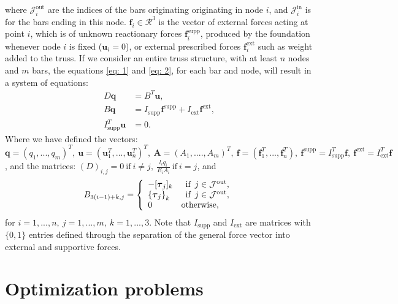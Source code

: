 \documentclass[10pt,a4paper]{article}
\begin{document}
where $\mathcal{J}_i^{\text{out}}$ are the indices of the bars originating originating in node $i$, and $\mathcal{J}_i^{\text{in}}$ is for the bars ending in this node. $\boldsymbol{f}_i\in\mathcal{R}^3$ is the vector of external forces acting at point $i$, which is of unknown reactionary forces $\boldsymbol{f}_i^{\text{supp}}$, produced by the foundation whenever node $i$ is fixed ($\boldsymbol{u}_i = 0$), or external prescribed forces $\boldsymbol{f}_i^{\text{ext}}$ such as weight added to the truss.
\newpage
\noindent
If we consider an entire truss structure, with at least $n$ nodes and $m$ bars, the equations \eqref{eq: 1} and \eqref{eq: 2}, for each bar and node, will result in a system of equations:
\begin{align}
\label{datsystem}
D \boldsymbol{q} &= B^T\boldsymbol{u},\\
B \boldsymbol{q} &= I_\text{supp}\boldsymbol{f}^{\text{supp}}+I_\text{ext}\boldsymbol{f}^{\text{ext}},\\
I_\text{supp}^T\boldsymbol{u} &= 0.
\end{align}
Where we have defined the vectors: $\boldsymbol{q} = (q_1,...,q_m)^T,\ \boldsymbol{u} = (\boldsymbol{u}_1^T,...,\boldsymbol{u}_n^T)^T,\ \boldsymbol{A}=(A_1,....,A_m)^T, \ \boldsymbol{f} = (\boldsymbol{f}_1^T,...,\boldsymbol{f}_n^T),\ \boldsymbol{f}^{\text{supp}} = I_\text{supp}^T\boldsymbol{f}, \ \boldsymbol{f}^{\text{ext}} = I_\text{ext}^T\boldsymbol{f}$, and the matrices: $(D)_{i,j} = 0 \ \text{if} \ i\neq j,\ \frac{l_i q_i}{E_i A_i} \ \text{if} \ i=j$, and
\begin{align}
B_{3(i-1)+k,j} = \left\lbrace 
\begin{array}{l l l l}
-[ \boldsymbol{\tau}_j]_k & \enspace \text{if} \enspace j \in \mathcal{J}^\text{out},\\
\left\lbrace \boldsymbol{\tau}_j\right\rbrace_k & \enspace \text{if} \enspace j \in \mathcal{J}^\text{out},\\
0 & \text{otherwise},
\end{array}\right.
\end{align}
for $i=1,...,n, \ j=1,...,m, \ k=1,...,3$. Note that $I_\text{supp}$ and $I_\text{ext}$ are matrices with $\{0,1\}$ entries defined through the separation of the general force vector into external and supportive forces.
\section{Optimization problems}
\end{document}
